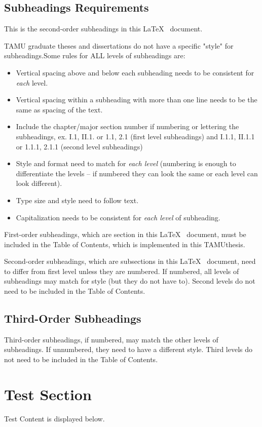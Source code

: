 \subsection{Subheadings Requirements}

This is the second-order subheadings in this \LaTeX ~ document.

TAMU graduate theses and dissertations do not have a specific "style" for subheadings.Some rules for ALL levels of subheadings are:
\begin{itemize}%
	\item   Vertical spacing above and below each subheading needs to be consistent for \emph{each} level.
	\item   Vertical spacing within a subheading with more than one line needs to be the same as spacing of the text.
	\item   Include the chapter/major section number if numbering or lettering the subheadings, ex. I.1, II.1. or 1.1, 2.1 (first level subheadings) and I.1.1, II.1.1 or 1.1.1, 2.1.1 (second level subheadings)
	\item   Style and format need to match for \emph{each level} (numbering is enough to differentiate the levels -- if numbered they can look the same or each level can look different).
	\item   Type size and style need to follow text.
	\item  Capitalization needs to be consistent for \emph{each level} of subheading.
\end{itemize}

First-order subheadings, which are section in this \LaTeX ~ document, must be included in the Table of Contents, which is implemented in this TAMUthesis.

Second-order subheadings, which are subsections in this \LaTeX ~ document, need to differ from first level unless they are numbered. If numbered, all levels of subheadings may match for style (but they do not have to). Second levels do not need to be included in the Table of Contents.
\subsection{Third-Order Subheadings}
Third-order subheadings, if numbered, may match the other levels of subheadings. If unnumbered, they need to have a different style. Third levels do not need to be included  in the Table of Contents.


\section{Test Section}
Test Content is displayed below.

